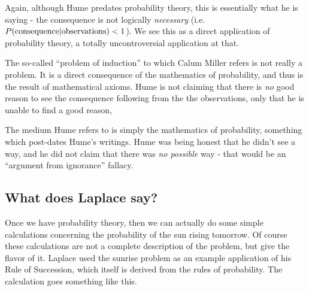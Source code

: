 
Again, although Hume predates probability theory, this is essentially
what he is saying - the consequence is not logically \emph{necessary}
(i.e. \(P({\rm consequence}|{\rm observations})<1\)). We see this as a
direct application of probability theory, a totally uncontroversial
application at that.

The so-called ``problem of induction'' to which Calum Miller refers is not really a problem. It is a direct consequence of the mathematics of probability, and thus is the result of mathematical axioms.  Hume is not claiming that there is {\em no} good reason to see the
consequence following from the the observations, only that he is unable to find a good reason,


The medium Hume refers to is simply the mathematics of probability,
something which post-dates Hume's writings. Hume was being honest that
he didn't see a way, and he did not claim that there was {\em no possible} way - that would be an ``argument from ignorance'' fallacy.

\subsection{What does Laplace say?}

Once we have probability theory, then we can actually do some simple
calculations concerning the probability of the sun rising tomorrow. Of
course these calculations are not a complete description of the problem,
but give the flavor of it. Laplace used the sunrise problem as an
example application of his Rule of Succession, which itself is derived
from the rules of probability. The calculation goes something like this.

